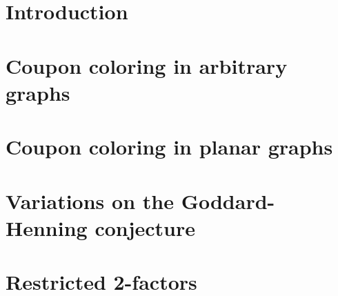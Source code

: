 \documentclass[12pt]{report}
\begin{document}


\newpage\null\thispagestyle{empty}\newpage

\tableofcontents

\chapter*{Introduction}


\chapter{Coupon coloring in arbitrary graphs}


\chapter{Coupon coloring in planar graphs}


\chapter{Variations on the Goddard-Henning conjecture}


\chapter{Restricted 2-factors} \label{ch:2-factors}

\end{document}
